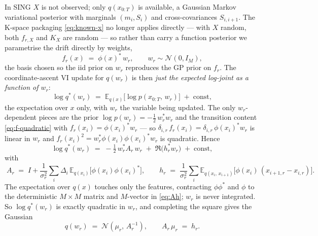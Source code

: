 \documentclass[11pt]{article}
\newcommand{\Eq}[1][q]{\mathbb{E}_{#1}}
\newcommand{\Eqx}{\mathbb{E}_{q(x_i)}}
\newcommand{\Eqxx}{\mathbb{E}_{q(x_i,\,x_{i+1})}}
\begin{document}
In SING $X$ is not observed; only $q(x_{0:T})$ is available, a Gaussian
Markov variational posterior with marginals $(m_i, S_i)$ and
cross-covariances $S_{i,i+1}$. The K-space packaging \eqref{eq:known-x}
no longer applies directly --- with $X$ random, both $f_{r,X}$ and $K_X$
are random --- so rather than carry a function posterior we parametrise
the drift directly by weights,
\begin{equation}
f_r(x) \;=\; \phi(x)^{*}\, w_r,
\qquad w_r \sim \mathcal{N}(0, I_M),
\label{eq:basis}
\end{equation}
the basis chosen so the iid prior on $w_r$ reproduces the GP prior on
$f_r$. The coordinate-ascent VI update for $q(w_r)$ is then \emph{just
the expected log-joint as a function of $w_r$}:
\begin{equation}
\log q^*(w_r)
\;=\;
\Eq[q(x)]\!\bigl[\log p(x_{0:T},\, w_r)\bigr]
\;+\; \text{const},
\label{eq:logqstar}
\end{equation}
the expectation over $x$ only, with $w_r$ the variable being updated.
The only $w_r$-dependent pieces are the prior
$\log p(w_r) = -\tfrac12\, w_r^{*}w_r$ and the transition content
\eqref{eq:f-quadratic} with $f_r(x_i)=\phi(x_i)^{*}w_r$ --- so
$\delta_{i,r}\,f_r(x_i)=\delta_{i,r}\,\phi(x_i)^{*}w_r$ is linear in
$w_r$ and $f_r(x_i)^2=w_r^{*}\phi(x_i)\phi(x_i)^{*}w_r$ is quadratic.
Hence
\begin{equation}
\log q^*(w_r)
\;=\;
-\tfrac12\, w_r^{*} A_r\, w_r
\;+\;
\Re\!\bigl(h_r^{*} w_r\bigr)
\;+\;\text{const},
\end{equation}
with
\begin{equation}
\boxed{\;
A_r \;=\; I + \frac{1}{\sigma_r^2}\sum_i \Delta_i\,
\Eqx\!\bigl[\phi(x_i)\phi(x_i)^{*}\bigr],
\qquad
h_r \;=\; \frac{1}{\sigma_r^2}\sum_i
\Eqxx\!\bigl[\phi(x_i)\,(x_{i+1,r}-x_{i,r})\bigr].
\;}
\label{eq:Ah}
\end{equation}
The expectation over $q(x)$ touches only the features, contracting
$\phi\phi^{*}$ and $\phi$ to the deterministic $M\times M$ matrix and
$M$-vector in \eqref{eq:Ah}; $w_r$ is never integrated. So
$\log q^*(w_r)$ is exactly quadratic in $w_r$, and completing the square
gives the Gaussian
\begin{equation}
q(w_r) \;=\; \mathcal{N}(\mu_r,\,A_r^{-1}),
\qquad
A_r\, \mu_r \;=\; h_r.
\label{eq:Ah-system}
\end{equation}
\end{document}
